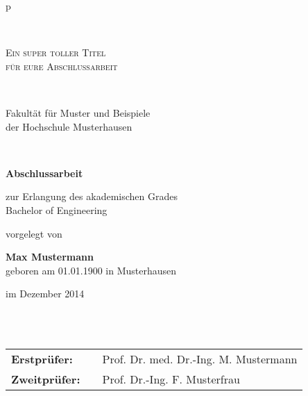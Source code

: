\begin{center}
\begin{tabular}{p{\textwidth}}


\begin{center}
\end{center}


\\

\begin{center}
\LARGE{\textsc{
Ein super toller Titel \\
für eure Abschlussarbeit\\
}}
\end{center}

\\


\begin{center}
\large{Fakultät für Muster und Beispiele \\
der Hochschule Musterhausen \\}
\end{center}

\\

\begin{center}
\textbf{\Large{Abschlussarbeit}}
\end{center}


\begin{center}
zur Erlangung des akademischen Grades\\
Bachelor of Engineering
\end{center}


\begin{center}
vorgelegt von
\end{center}

\begin{center}
\large{\textbf{Max Mustermann}} \\
\small{geboren am 01.01.1900 in Musterhausen}
\end{center}

\begin{center}
\large{im Dezember 2014}
\end{center}

\\

\\

\begin{center}
\begin{tabular}{lll}
\textbf{Erstprüfer:} & & Prof. Dr. med. Dr.-Ing. M. Mustermann\\
\textbf{Zweitprüfer:} & &Prof. Dr.-Ing. F. Musterfrau\\
\end{tabular}
\end{center}

\end{tabular}
\end{center}